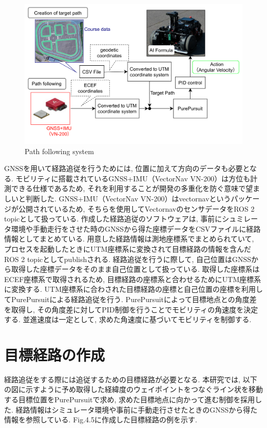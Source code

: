 \begin{figure}[H]
  \centering
 \includegraphics[keepaspectratio, scale=0.2]
      {images/system.png}
 \caption{Path following system}
 \label{fig:system}
\end{figure}

GNSSを用いて経路追従を行うためには, 位置に加えて方向のデータも必要となる.
モビリティに搭載されているGNSS+IMU（VectorNav VN-200）は方位も計測できる仕様であるため, それを利用することが開発の多重化を防ぐ意味で望ましいと判断した.
GNSS+IMU（VectorNav VN-200）はvectornav\cite{vectornav}というパッケージが公開されているため, そちらを使用してVectornavのセンサデータをROS 2 topicとして扱っている.
作成した経路追従のソフトウェアは, 事前にシュミレータ環境や手動走行をさせた時のGNSSから得た座標データをCSVファイルに経路情報としてまとめている.
用意した経路情報は測地座標系でまとめられていて, プロセスを起動したときにUTM座標系に変換されて目標経路の情報を含んだROS 2 topicとしてpublishされる.
経路追従を行うに際して, 自己位置はGNSSから取得した座標データをそのまま自己位置として扱っている.
取得した座標系はECEF座標系で取得されるため, 目標経路の座標系と合わせるためにUTM座標系に変換する.
UTM座標系に合わされた目標経路の座標と自己位置の座標を利用してPurePursuitによる経路追従を行う.
PurePursuitによって目標地点との角度差を取得し, その角度差に対してPID制御を行うことでモビリティの角速度を決定する.
並進速度は一定として, 求めた角速度に基づいてモビリティを制御する.

\section{目標経路の作成}
経路追従をする際には追従するための目標経路が必要となる.
本研究では, 以下の図に示すように予め取得した経緯度のウェイポイントをつなぐライン状を移動する目標位置をPurePursuitで求め, 求めた目標地点に向かって進む制御を採用した.
経路情報はシミュレータ環境や事前に手動走行させたときのGNSSから得た情報を参照している.
Fig.4.5に作成した目標経路の例を示す.

